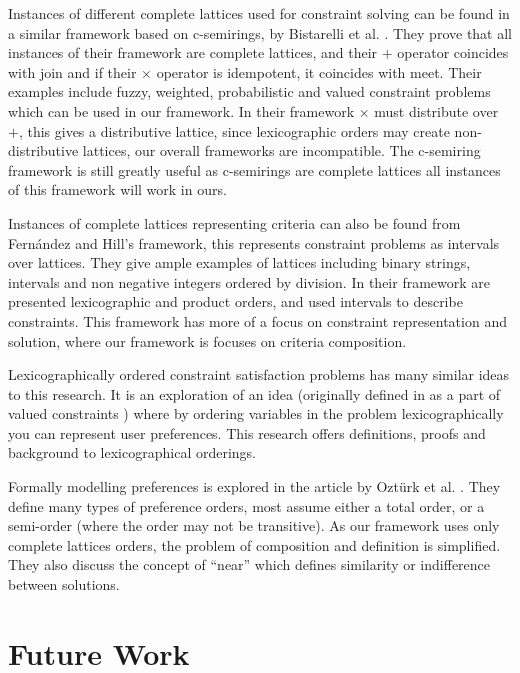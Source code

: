 Instances of different complete lattices used for constraint solving can be found in a similar framework based on c-semirings, 
by Bistarelli et al. \cite{Bistarelli1997}.
They prove that all instances of their framework are complete lattices, and their $+$ operator coincides with join
and if their $\times$ operator is idempotent, it coincides with meet.
Their examples include fuzzy, weighted, probabilistic and valued constraint problems which can be used in our framework.
In their framework $\times$ must distribute over $+$, this gives a distributive lattice,
since lexicographic orders may create non-distributive lattices, our overall frameworks are incompatible.
The c-semiring framework is still greatly useful as c-semirings are complete lattices all instances of this framework will work in ours.

Instances of complete lattices representing criteria can also be found from Fern\'{a}ndez and Hill's \cite{Fernandez} framework,
this represents constraint problems as intervals over lattices.
They give ample examples of lattices including binary strings, intervals and non negative integers ordered by division.
In their framework are presented lexicographic and product orders, and used intervals to describe constraints.
This framework has more of a focus on constraint representation and solution, 
where our framework is focuses on criteria composition.

Lexicographically ordered constraint satisfaction problems \cite{Freuder2009} has many similar ideas to this research.
It is an exploration of an idea (originally defined in as a part of valued constraints \cite{schiex1995valued})
where by ordering variables in the problem lexicographically you can represent user preferences.
This research offers definitions, proofs and background to lexicographical orderings.

Formally modelling preferences is explored in the article by Ozt\"urk et al. \cite{Ozturk}.
They define many types of preference orders, most assume either a total order, or a semi-order (where the order may not be transitive).
As our framework uses only complete lattices orders, the problem of composition and definition is simplified. 
They also discuss the concept of ``near'' which defines similarity or indifference between solutions.

\section{Future Work}


